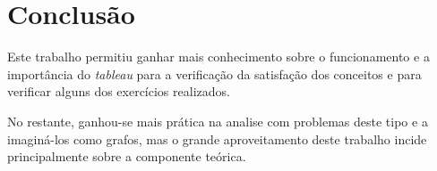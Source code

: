 

\chapter{Conclusão}
\label{ch:conclusão}

Este trabalho permitiu ganhar mais conhecimento sobre o funcionamento e a importância do \textit{tableau} para a verificação da satisfação dos conceitos e para verificar alguns dos exercícios realizados.

No restante, ganhou-se mais prática na analise com problemas deste tipo e a  imaginá-los como grafos, mas o grande aproveitamento deste trabalho incide principalmente sobre a componente teórica.